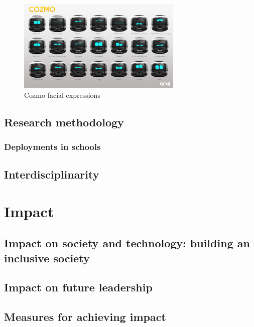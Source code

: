 \documentclass[]{article}
\begin{document}
\begin{figure}[!htbp]
\centering
    \includegraphics[width=0.7\textwidth]{figs/cozmo-expression-sheet.jpg}
\caption{Cozmo facial expressions}
\end{figure}


\subsection{Research methodology}\label{research-methodology}


\subsubsection{Deployments in schools}

\subsection{Interdisciplinarity}

\newpage
\section{Impact}\label{impact}

\subsection{Impact on society and technology: building an inclusive society}

\subsection{Impact on future leadership}

\subsection{Measures for achieving impact}
\end{document}
